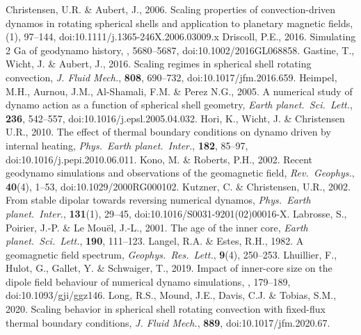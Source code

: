 \begin{thebibliography}{}
%
Christensen, U.R. \& Aubert, J., 2006. Scaling properties of convection-driven dynamos in rotating spherical shells and application to planetary magnetic fields, (1), 97--144, doi:10.1111/j.1365-246X.2006.03009.x
%
Driscoll, P.E., 2016. Simulating 2 Ga of geodynamo history, , 5680--5687, doi:10.1002/2016GL068858.
%
{\color{red}
Gastine, T., Wicht, J. \& Aubert, J., 2016. Scaling regimes in spherical shell rotating convection, {\it J. Fluid Mech.}, {\bf 808}, 690--732, doi:10.1017/jfm.2016.659.
}
%
Heimpel, M.H., Aurnou, J.M., Al-Shamali, F.M. \& Perez N.G., 2005. A numerical study of dynamo action as a function of spherical shell geometry, {\it Earth planet.\ Sci.\ Lett.}, {\bf 236}, 542--557, doi:10.1016/j.epsl.2005.04.032.
%
Hori, K., Wicht, J. \& Christensen U.R., 2010. The effect of thermal boundary conditions on dynamo driven by internal heating, {\it Phys.\ Earth planet.\ Inter.}, {\bf 182}, 85--97, doi:10.1016/j.pepi.2010.06.011.
%
Kono, M. \& Roberts, P.H., 2002. Recent geodynamo simulations and observations of the geomagnetic field, {\it Rev.\ Geophys.}, {\bf 40}(4), 1--53, doi:10.1029/2000RG000102.
%
Kutzner, C. \& Christensen, U.R., 2002. From stable dipolar towards reversing numerical dynamos, {\it Phys.\ Earth planet.\ Inter.}, {\bf 131}(1), 29--45, doi:10.1016/S0031-9201(02)00016-X.
%
Labrosse, S., Poirier, J.-P. \& Le Mou{\"e}l, J.-L., 2001. The age of the inner core, {\it Earth planet.\ Sci.\ Lett.}, {\bf 190}, 111--123.
%
Langel, R.A. \& Estes, R.H., 1982. A geomagnetic field spectrum, {\it Geophys.\ Res.\ Lett.}, {\bf 9}(4), 250--253.
%
Lhuillier, F., Hulot, G., Gallet, Y. \& Schwaiger, T., 2019. Impact of inner-core size on the dipole field behaviour of numerical dynamo simulations, , 179--189, doi:10.1093/gji/ggz146.
%
Long, R.S., Mound, J.E., Davis, C.J. \& Tobias, S.M., 2020. Scaling behavior in spherical shell rotating convection with fixed-flux thermal boundary conditions, {\it J. Fluid Mech.}, {\bf 889}, doi:10.1017/jfm.2020.67.

\end{thebibliography}
